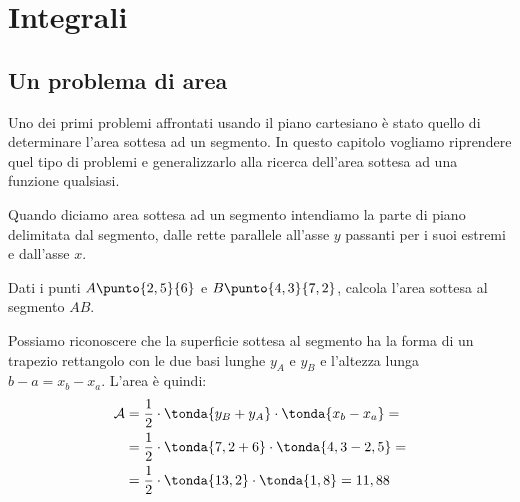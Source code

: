 


% 

\chapter{Integrali}

\section{Un problema di area}
\label{sec:integrali_area}

Uno dei primi problemi affrontati usando il piano cartesiano è stato quello 
di determinare l'area sottesa ad un segmento. In questo capitolo vogliamo 
riprendere quel tipo di problemi e generalizzarlo alla ricerca dell'area 
sottesa ad una funzione qualsiasi.

Quando diciamo area sottesa ad un segmento intendiamo la parte di piano 
delimitata dal segmento, dalle rette parallele all'asse \(y\) passanti per i 
suoi estremi e dall'asse \(x\).

\begin{esempio}
Dati i punti \(A \punto{2,5}{6}\) e \(B \punto{4,3}{7,2}\), calcola l'area 
sottesa al segmento \(AB\).

\begin{minipage}{.29\textwidth}
\begin{inaccessibleblock}
  \areasottesasegmento
\end{inaccessibleblock}
\end{minipage}
\hfill
\begin{minipage}{.69\textwidth}
 Possiamo riconoscere che la superficie sottesa al segmento ha la forma di un 
trapezio rettangolo con le due basi lunghe \(y_A\) e \(y_B\) e l'altezza 
lunga \(b - a = x_b - x_a\). L'area è quindi:
\begin{align*}
 \mathcal{A} &= \frac{1}{2} \cdot \tonda{y_B + y_A} \cdot \tonda{x_b - x_a}=\\
             &= \frac{1}{2} \cdot \tonda{7,2 + 6} \cdot \tonda{4,3 - 2,5} =\\
             &= \frac{1}{2} \cdot \tonda{13,2} \cdot \tonda{1,8} = 11,88
\end{align*}
\end{minipage}
\end{esempio}

